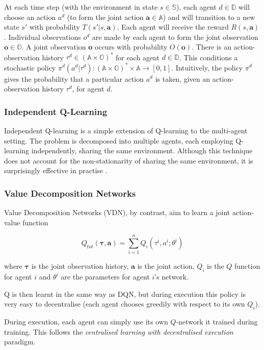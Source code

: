 At each time step (with the environment in state $s \in \mathbb{S}$), each agent $d \in \mathbb{D}$ will choose an action $a^d$ (to form the joint action $\textbf{a} \in \mathbb{A}$) and will transition to a new state $s'$ with probability $T(s'|s,\textbf{a})$. Each agent will receive the reward $R(s, \textbf{a})$. Individual observations $o^d$ are made by each agent to form the joint observation $\textbf{o} \in \mathbb{O}$. A joint observation \textbf{o} occurs with probability $O(\textbf{o})$. There is an action-observation history $\tau^d \in (\mathbb{A} \times \mathbb{O})^*$ for each agent $d \in \mathbb{D}$. This conditions a stochastic policy $\pi^d(a^d|\tau^d) : (\mathbb{A} \times \mathbb{O})^* \times \mathbb{A} \to [0, 1]$. Intuitively, the policy $\pi^d$ gives the probability that a particular action $a^d$ is taken, given an action-observation history $\tau^d$, for agent $d$.

\subsubsection{Independent Q-Learning}
Independent Q-learning \cite{IQL} is a simple extension of Q-learning to the multi-agent setting. The problem is decomposed into multiple agents, each employing Q-learning independently, sharing the same environment. Although this technique does not account for the non-stationarity of sharing the same environment, it is surprisingly effective in practise \cite{iqlisgood}. 


\subsubsection{Value Decomposition Networks}
Value Decomposition Networks \cite{vdn} (VDN), by contrast, aim to learn a joint action-value function

\[Q_{tot}(\boldsymbol{\tau}, \textbf{a}) = \sum_{i=1}^{n} Q_i(\tau^i,a^i;\theta^i) \]

where $\boldsymbol{\tau}$ is the joint observation history, $\textbf{a}$ is the joint action, $Q_i$ is the $Q$ function for agent $i$ and $\theta^i$ are the parameters for agent $i$'s network.

Q is then learnt in the same way as DQN, but during execution this policy is very easy to decentralise (each agent chooses greedily with respect to its own $Q_i$).

During execution, each agent can simply use its own $Q$-network it trained during training. This follows the \textit{centralised learning with decentralised execution} paradigm.

